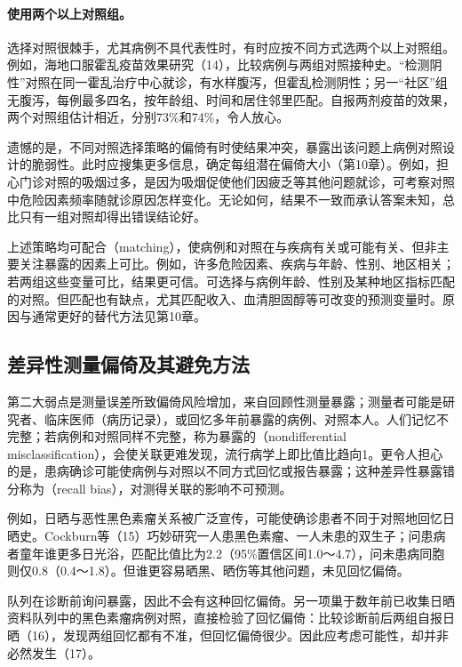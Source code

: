\paragraph{使用两个以上对照组。}选择对照很棘手，尤其病例不具代表性时，有时应按不同方式选两个以上对照组。例如，海地口服霍乱疫苗效果研究（14），比较病例与两组对照接种史。“检测阴性”对照在同一霍乱治疗中心就诊，有水样腹泻，但霍乱检测阴性；另一“社区”组无腹泻，每例最多四名，按年龄组、时间和居住邻里匹配。自报两剂疫苗的效果，两个对照组估计相近，分别73\%和74\%，令人放心。

遗憾的是，不同对照选择策略的偏倚有时使结果冲突，暴露出该问题上病例对照设计的脆弱性。此时应搜集更多信息，确定每组潜在偏倚大小（第10章）。例如，担心门诊对照的吸烟过多，是因为吸烟促使他们因疲乏等其他问题就诊，可考察对照中危险因素频率随就诊原因怎样变化。无论如何，结果不一致而承认答案未知，总比只有一组对照却得出错误结论好。

上述策略均可配合（matching），使病例和对照在与疾病有关或可能有关、但非主要关注暴露的因素上可比。例如，许多危险因素、疾病与年龄、性别、地区相关；若两组这些变量可比，结果更可信。可选择与病例年龄、性别及某种地区指标匹配的对照。但匹配也有缺点，尤其匹配收入、血清胆固醇等可改变的预测变量时。原因与通常更好的替代方法见第10章。

\subsection{差异性测量偏倚及其避免方法}
第二大弱点是测量误差所致偏倚风险增加，来自回顾性测量暴露；测量者可能是研究者、临床医师（病历记录），或回忆多年前暴露的病例、对照本人。人们记忆不完整；若病例和对照同样不完整，称为暴露的（nondifferential misclassification），会使关联更难发现，流行病学上即比值比趋向1。更令人担心的是，患病确诊可能使病例与对照以不同方式回忆或报告暴露；这种差异性暴露错分称为（recall bias），对测得关联的影响不可预测。

例如，日晒与恶性黑色素瘤关系被广泛宣传，可能使确诊患者不同于对照地回忆日晒史。Cockburn等（15）巧妙研究一人患黑色素瘤、一人未患的双生子；问患病者童年谁更多日光浴，匹配比值比为2.2（95\%置信区间1.0～4.7），问未患病同胞则仅0.8（0.4～1.8）。但谁更容易晒黑、晒伤等其他问题，未见回忆偏倚。

队列在诊断前询问暴露，因此不会有这种回忆偏倚。另一项巢于数年前已收集日晒资料队列中的黑色素瘤病例对照，直接检验了回忆偏倚：比较诊断前后两组自报日晒（16），发现两组回忆都有不准，但回忆偏倚很少。因此应考虑可能性，却并非必然发生（17）。

